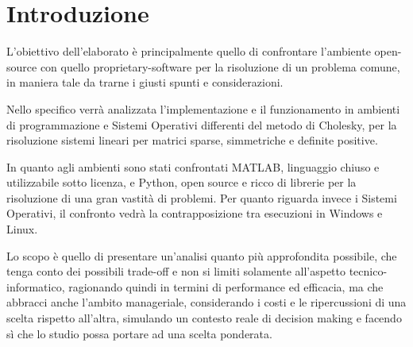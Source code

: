 \section{Introduzione}

L'obiettivo dell'elaborato è principalmente quello di confrontare l'ambiente open-source con quello proprietary-software per la risoluzione di un problema comune, in maniera tale da trarne i giusti spunti e considerazioni.

Nello specifico verrà analizzata l'implementazione e il funzionamento in ambienti di programmazione e Sistemi Operativi differenti del metodo di Cholesky, per la risoluzione sistemi lineari per matrici sparse, simmetriche e deﬁnite positive.

In quanto agli ambienti sono stati confrontati MATLAB, linguaggio chiuso e utilizzabile sotto licenza, e Python, open source e ricco di librerie per la risoluzione di una gran vastità di problemi.
Per quanto riguarda invece i Sistemi Operativi, il confronto vedrà la contrapposizione tra esecuzioni in Windows e Linux.

Lo scopo è quello di presentare un'analisi quanto più approfondita possibile, che tenga conto dei possibili trade-off e non si limiti solamente all'aspetto tecnico-informatico, ragionando quindi in termini di performance ed efficacia, ma che abbracci anche l'ambito manageriale, considerando i costi e le ripercussioni di una scelta rispetto all'altra, simulando un contesto reale di decision making e facendo sì che lo studio possa portare ad una scelta ponderata.